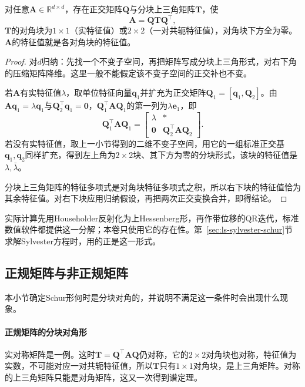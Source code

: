 \begin{theorem}[实Schur形]
\label{thm:ls-real-schur}
对任意$\bm A\in\mathbb R^{d\times d}$，存在正交矩阵$\bm Q$与分块上三角矩阵$\bm T$，使
\begin{equation}
 \bm A=\bm Q\bm T\bm Q^{\top},
 \label{eq:matrix-analysis-schur-decomposition}
\end{equation}
$\bm T$的对角块为$1\times1$（实特征值）或$2\times2$（一对共轭特征值），对角块下方全为零。$\bm A$的特征值就是各对角块的特征值。
\end{theorem}
\begin{proof}
对$d$归纳：先找一个不变子空间，再把矩阵写成分块上三角形式，对右下角的压缩矩阵降维。这里一般不能假定该不变子空间的正交补也不变。

若$\bm A$有实特征值$\lambda$，取单位特征向量$\bm q_1$并扩充为正交矩阵$\bm Q_1=[\bm q_1,\bm Q_2]$。由$\bm A\bm q_1=\lambda\bm q_1$与$\bm Q_2^\top\bm q_1=\bm0$，$\bm Q_1^\top\bm A\bm Q_1$的第一列为$\lambda\bm e_1$，即
\[
 \bm Q_1^\top\bm A\bm Q_1=\begin{bmatrix}\lambda&*\\\bm0&\bm Q_2^\top\bm A\bm Q_2\end{bmatrix}.
\]
若没有实特征值，取上一小节得到的二维不变子空间，用它的一组标准正交基$\bm q_1,\bm q_2$同样扩充，得到左上角为$2\times2$块、其下方为零的分块形式，该块的特征值是$\lambda,\bar\lambda$。

分块上三角矩阵的特征多项式是对角块特征多项式之积，所以右下块的特征值恰为其余特征值。对右下块应用归纳假设，再把两次正交变换合并，即得结论。
\end{proof}
实际计算先用Householder反射化为上Hessenberg形，再作带位移的QR迭代，标准数值软件都提供这一分解；本卷只使用它的存在性。第~\ref{sec:ls-sylvester-schur}节求解Sylvester方程时，用的正是这一形式。

\subsection{正规矩阵与非正规矩阵}

本小节确定Schur形何时是分块对角的，并说明不满足这一条件时会出现什么现象。

\paragraph{正规矩阵的分块对角形}实对称矩阵是一例。这时$\bm T=\bm Q^\top\bm A\bm Q$仍对称，它的$2\times2$对角块也对称，特征值为实数，不可能对应一对共轭特征值，所以$\bm T$只有$1\times1$对角块，是上三角矩阵。对称的上三角矩阵只能是对角矩阵，这又一次得到谱定理。

